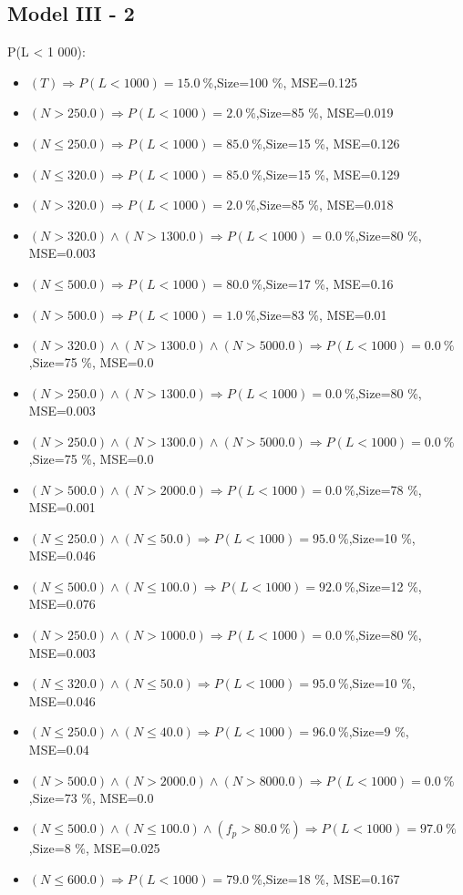 \documentclass[numbered]{CSL}
\begin{document}
\subsection{Model III - 2}
P(L < 1 000):
\begin{itemize}
\item $(T) \Rightarrow P(L < 1 000) = 15.0~\%$,\hfill Size=100 \%, MSE=0.125
\item $(N > 250.0) \Rightarrow P(L < 1 000) = 2.0~\%$,\hfill Size=85 \%, MSE=0.019
\item $(N \leq 250.0) \Rightarrow P(L < 1 000) = 85.0~\%$,\hfill Size=15 \%, MSE=0.126
\item $(N \leq 320.0) \Rightarrow P(L < 1 000) = 85.0~\%$,\hfill Size=15 \%, MSE=0.129
\item $(N > 320.0) \Rightarrow P(L < 1 000) = 2.0~\%$,\hfill Size=85 \%, MSE=0.018
\item $(N > 320.0) \land (N > 1300.0) \Rightarrow P(L < 1 000) = 0.0~\%$,\hfill Size=80 \%, MSE=0.003
\item $(N \leq 500.0) \Rightarrow P(L < 1 000) = 80.0~\%$,\hfill Size=17 \%, MSE=0.16
\item $(N > 500.0) \Rightarrow P(L < 1 000) = 1.0~\%$,\hfill Size=83 \%, MSE=0.01
\item $(N > 320.0) \land (N > 1300.0) \land (N > 5000.0) \Rightarrow P(L < 1 000) = 0.0~\%$,\hfill Size=75 \%, MSE=0.0
\item $(N > 250.0) \land (N > 1300.0) \Rightarrow P(L < 1 000) = 0.0~\%$,\hfill Size=80 \%, MSE=0.003
\item $(N > 250.0) \land (N > 1300.0) \land (N > 5000.0) \Rightarrow P(L < 1 000) = 0.0~\%$,\hfill Size=75 \%, MSE=0.0
\item $(N > 500.0) \land (N > 2000.0) \Rightarrow P(L < 1 000) = 0.0~\%$,\hfill Size=78 \%, MSE=0.001
\item $(N \leq 250.0) \land (N \leq 50.0) \Rightarrow P(L < 1 000) = 95.0~\%$,\hfill Size=10 \%, MSE=0.046
\item $(N \leq 500.0) \land (N \leq 100.0) \Rightarrow P(L < 1 000) = 92.0~\%$,\hfill Size=12 \%, MSE=0.076
\item $(N > 250.0) \land (N > 1000.0) \Rightarrow P(L < 1 000) = 0.0~\%$,\hfill Size=80 \%, MSE=0.003
\item $(N \leq 320.0) \land (N \leq 50.0) \Rightarrow P(L < 1 000) = 95.0~\%$,\hfill Size=10 \%, MSE=0.046
\item $(N \leq 250.0) \land (N \leq 40.0) \Rightarrow P(L < 1 000) = 96.0~\%$,\hfill Size=9 \%, MSE=0.04
\item $(N > 500.0) \land (N > 2000.0) \land (N > 8000.0) \Rightarrow P(L < 1 000) = 0.0~\%$,\hfill Size=73 \%, MSE=0.0
\item $(N \leq 500.0) \land (N \leq 100.0) \land (f_p > 80.0~\%) \Rightarrow P(L < 1 000) = 97.0~\%$,\hfill Size=8 \%, MSE=0.025
\item $(N \leq 600.0) \Rightarrow P(L < 1 000) = 79.0~\%$,\hfill Size=18 \%, MSE=0.167
\end{itemize}
\end{document}
